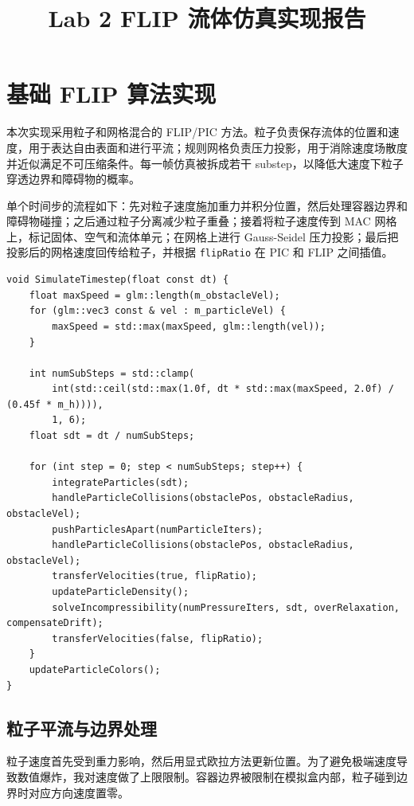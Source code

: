 \documentclass[UTF8,a4paper,11pt]{ctexart}
\title{Lab 2 FLIP 流体仿真实现报告}
\author{}
\date{}
\begin{document}
\maketitle

\section{基础 FLIP 算法实现}

本次实现采用粒子和网格混合的 FLIP/PIC 方法。粒子负责保存流体的位置和速度，用于表达自由表面和进行平流；规则网格负责压力投影，用于消除速度场散度并近似满足不可压缩条件。每一帧仿真被拆成若干 substep，以降低大速度下粒子穿透边界和障碍物的概率。

单个时间步的流程如下：先对粒子速度施加重力并积分位置，然后处理容器边界和障碍物碰撞；之后通过粒子分离减少粒子重叠；接着将粒子速度传到 MAC 网格上，标记固体、空气和流体单元；在网格上进行 Gauss-Seidel 压力投影；最后把投影后的网格速度回传给粒子，并根据 \texttt{flipRatio} 在 PIC 和 FLIP 之间插值。

\begin{lstlisting}[style=cppstyle,caption={单步 FLIP 仿真流程}]
void SimulateTimestep(float const dt) {
    float maxSpeed = glm::length(m_obstacleVel);
    for (glm::vec3 const & vel : m_particleVel) {
        maxSpeed = std::max(maxSpeed, glm::length(vel));
    }

    int numSubSteps = std::clamp(
        int(std::ceil(std::max(1.0f, dt * std::max(maxSpeed, 2.0f) / (0.45f * m_h)))),
        1, 6);
    float sdt = dt / numSubSteps;

    for (int step = 0; step < numSubSteps; step++) {
        integrateParticles(sdt);
        handleParticleCollisions(obstaclePos, obstacleRadius, obstacleVel);
        pushParticlesApart(numParticleIters);
        handleParticleCollisions(obstaclePos, obstacleRadius, obstacleVel);
        transferVelocities(true, flipRatio);
        updateParticleDensity();
        solveIncompressibility(numPressureIters, sdt, overRelaxation, compensateDrift);
        transferVelocities(false, flipRatio);
    }
    updateParticleColors();
}
\end{lstlisting}

\subsection{粒子平流与边界处理}

粒子速度首先受到重力影响，然后用显式欧拉方法更新位置。为了避免极端速度导致数值爆炸，我对速度做了上限限制。容器边界被限制在模拟盒内部，粒子碰到边界时对应方向速度置零。
\end{document}

